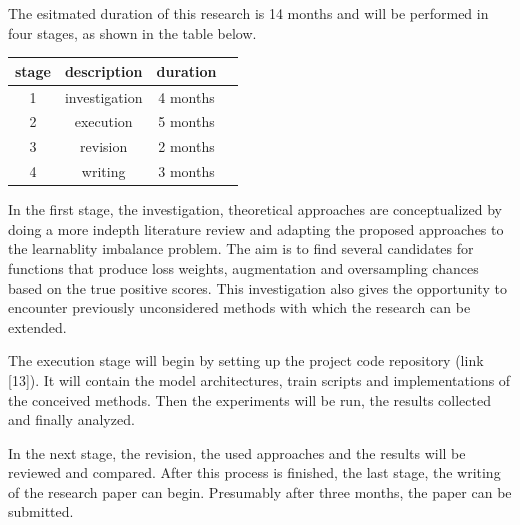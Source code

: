 \documentclass[journal]{IEEEtran}
\begin{document}
The esitmated duration of this research is 14 months and will be performed in four stages, as shown in the table below.

\begin{center}

        \begin{tabular}{ |c|c|c|c| } 
                \hline
                stage & description & duration \\
                \hline
                1 & investigation & 4 months \\ 
                2 & execution & 5 months \\ 
                3 & revision & 2 months \\ 
                4 & writing & 3 months \\
                \hline

        \end{tabular}
\end{center}
        
In the first stage, the investigation, theoretical approaches are conceptualized by doing a more indepth literature review and adapting the proposed approaches to the learnablity imbalance problem. 
The aim is to find several candidates for functions that produce loss weights, augmentation and oversampling chances based on the true positive scores.
This investigation also gives the opportunity to encounter previously unconsidered methods with which the research can be extended.

The execution stage will begin by setting up the project code repository (link [13]). 
It will contain the model architectures, train scripts and implementations of the conceived methods.
Then the experiments will be run, the results collected and finally analyzed. 

In the next stage, the revision, the used approaches and the results will be reviewed and compared. 
After this process is finished, the last stage, the writing of the research paper can begin. 
Presumably after three months, the paper can be submitted.  
\end{document}
